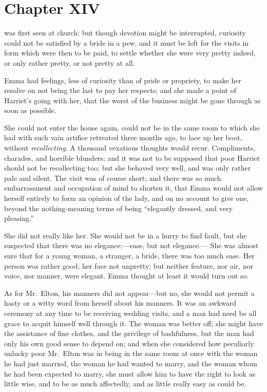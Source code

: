 \chapter{Chapter XIV}


 was first seen at church:  but though devotion might
be interrupted, curiosity could not be satisfied by a bride in a pew,
and it must be left for the visits in form which were then to be paid,
to settle whether she were very pretty indeed, or only rather pretty,
or not pretty at all.

Emma had feelings, less of curiosity than of pride or propriety,
to make her resolve on not being the last to pay her respects;
and she made a point of Harriet's going with her, that the worst of
the business might be gone through as soon as possible.

She could not enter the house again, could not be in the same room
to which she had with such vain artifice retreated three months ago,
to lace up her boot, without \emph{recollecting}.  A thousand vexatious
thoughts would recur.  Compliments, charades, and horrible blunders;
and it was not to be supposed that poor Harriet should not be
recollecting too; but she behaved very well, and was only rather
pale and silent.  The visit was of course short; and there was so
much embarrassment and occupation of mind to shorten it, that Emma
would not allow herself entirely to form an opinion of the lady,
and on no account to give one, beyond the nothing-meaning terms
of being ``elegantly dressed, and very pleasing.''

She did not really like her.  She would not be in a hurry to find fault,
but she suspected that there was no elegance;---ease, but not elegance.---%
She was almost sure that for a young woman, a stranger, a bride,
there was too much ease.  Her person was rather good; her face
not unpretty; but neither feature, nor air, nor voice, nor manner,
were elegant.  Emma thought at least it would turn out so.

As for Mr.\ Elton, his manners did not appear---but no, she would
not permit a hasty or a witty word from herself about his manners.
It was an awkward ceremony at any time to be receiving wedding visits,
and a man had need be all grace to acquit himself well through it.
The woman was better off; she might have the assistance of fine clothes,
and the privilege of bashfulness, but the man had only his own
good sense to depend on; and when she considered how peculiarly
unlucky poor Mr.\ Elton was in being in the same room at once with
the woman he had just married, the woman he had wanted to marry,
and the woman whom he had been expected to marry, she must allow him
to have the right to look as little wise, and to be as much affectedly,
and as little really easy as could be.

